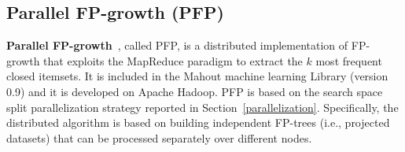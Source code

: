 \documentclass[preprint,review,12pt]{elsarticle}
\begin{document}
\subsection{Parallel FP-growth (PFP)}
\label{FP-Growth}
{\bf Parallel FP-growth}~\cite{pfpgrowth}, called PFP, is a distributed implementation of FP-growth
that exploits the MapReduce paradigm to extract the $k$ most frequent closed
itemsets. It is included in the Mahout machine learning Library (version 0.9)
and it is developed on Apache Hadoop. 
PFP is based on the search space split parallelization strategy reported in Section~\ref{parallelization}. 
Specifically, the distributed algorithm is based on building independent FP-trees (i.e., projected datasets) that can be processed separately
over different nodes.
\end{document}
